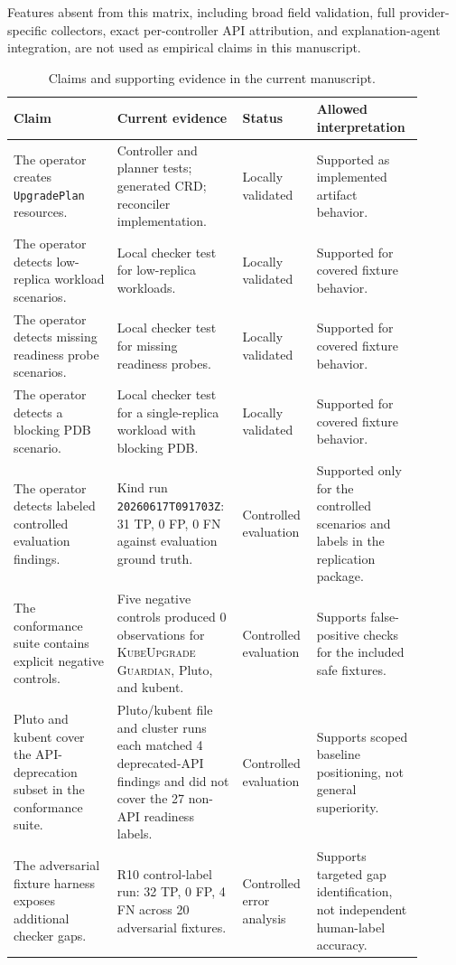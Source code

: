 \documentclass[10pt,journal]{IEEEtran}
\newcommand{\tool}{\textsc{KubeUpgrade Guardian}}
\newcommand{\crd}[1]{\texttt{#1}}
\newcommand{\code}[1]{\texttt{#1}}
\begin{document}
Features absent from this matrix, including broad field validation, full provider-specific collectors, exact per-controller API attribution, and explanation-agent integration, are not used as empirical claims in this manuscript.

\begin{table}[t]
  \centering
  \caption{Claims and supporting evidence in the current manuscript.}
  \label{tab:claims-evidence}
  \scriptsize
  \begin{tabular}{p{0.24\linewidth}p{0.26\linewidth}p{0.16\linewidth}p{0.24\linewidth}}
    \toprule
    Claim & Current evidence & Status & Allowed interpretation \\
    \midrule
    The operator creates \crd{UpgradePlan} resources. & Controller and planner tests; generated CRD; reconciler implementation. & Locally validated & Supported as implemented artifact behavior. \\
    The operator detects low-replica workload scenarios. & Local checker test for low-replica workloads. & Locally validated & Supported for covered fixture behavior. \\
    The operator detects missing readiness probe scenarios. & Local checker test for missing readiness probes. & Locally validated & Supported for covered fixture behavior. \\
    The operator detects a blocking PDB scenario. & Local checker test for a single-replica workload with blocking PDB. & Locally validated & Supported for covered fixture behavior. \\
    The operator detects labeled controlled evaluation findings. & Kind run \code{20260617T091703Z}: 31 TP, 0 FP, 0 FN against evaluation ground truth. & Controlled evaluation & Supported only for the controlled scenarios and labels in the replication package. \\
    The conformance suite contains explicit negative controls. & Five negative controls produced 0 observations for \tool{}, Pluto, and kubent. & Controlled evaluation & Supports false-positive checks for the included safe fixtures. \\
    Pluto and kubent cover the API-deprecation subset in the conformance suite. & Pluto/kubent file and cluster runs each matched 4 deprecated-API findings and did not cover the 27 non-API readiness labels. & Controlled evaluation & Supports scoped baseline positioning, not general superiority. \\
    The adversarial fixture harness exposes additional checker gaps. & R10 control-label run: 32 TP, 0 FP, 4 FN across 20 adversarial fixtures. & Controlled error analysis & Supports targeted gap identification, not independent human-label accuracy. \\

\end{tabular}
\end{table}
\end{document}
